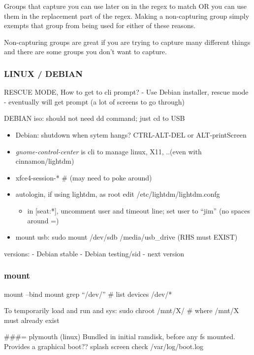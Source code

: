 \documentclass[
  letterpaper,
  DIV=11,
  numbers=noendperiod]{scrartcl}
\providecommand{\tightlist}{%
  \setlength{\itemsep}{0pt}\setlength{\parskip}{0pt}}\usepackage{longtable,booktabs,array}
\begin{document}
Groups that capture you can use later on in the regex to match OR you
can use them in the replacement part of the regex. Making a
non-capturing group simply exempts that group from being used for either
of these reasons.

Non-capturing groups are great if you are trying to capture many
different things and there are some groups you don't want to capture.

\subsubsection{LINUX / DEBIAN}\label{linux-debian}

RESCUE MODE, How to get to cli prompt? - Use Debian installer, rescue
mode - eventually will get prompt (a lot of screens to go through)

DEBIAN iso: should not need dd command; just cd to USB

\begin{itemize}
\item
  Debian: shutdown when sytem hangs? CTRL-ALT-DEL or ALT-printScreen
\item
  \emph{gnome-control-center} is cli to manage linux, X11, ..(even with
  cinnamon/lightdm)
\item
  xfce4-session-* \# (may need to poke around)
\item
  autologin, if using lightdm, as root edit /etc/lightdm/lightdm.confg

  \begin{itemize}
  \tightlist
  \item
    in {[}seat:*{]}, uncomment user and timeout line; set user to
    ``jim'' (no spaces around =)
  \end{itemize}
\item
  mount usb: sudo mount /dev/sdb /media/usb\_drive (RHS must EXIST)
\end{itemize}

versions: - Debian stable - Debian testing/sid - next version

\subsubsection{mount}\label{mount}

mount --bind mount \textbar{} grep ``/dev/'' \# list devices /dev/*

To temporarily load and run and sys: sudo chroot /mnt/X/ \# where /mnt/X
must already exist

\#\#\#= plymouth (linux) Bundled in initial ramdisk, before any fs
mounted. Provides a graphical boot?? splash screen check
/var/log/boot.log
\end{document}
